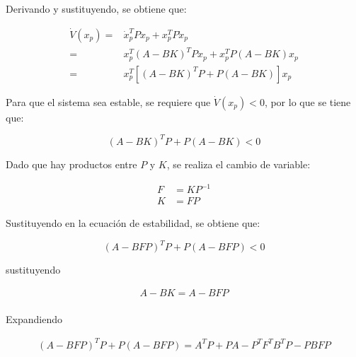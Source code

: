 \begin{enumerate}
\begin{itemize}
        Derivando y sustituyendo, se obtiene que:

        \begin{equation*}
            \begin{aligned}
                \dot{V}(x_p)=&\dot{x}_p^TPx_p+x_p^TP\dot{x}_p\\
                =&x_p^T(A-BK)^TPx_p+x_p^TP(A-BK)x_p\\
                =&x_p^T[(A-BK)^TP+P(A-BK)]x_p
            \end{aligned}
        \end{equation*}

        Para que el sistema sea estable, se requiere que \(\dot{V}(x_p)<0\), por lo que se tiene que:

        \begin{equation*}
            (A-BK)^TP+P(A-BK)<0
        \end{equation*}

        Dado que hay productos entre \(P\) y \(K\), se realiza el cambio de variable:

        \begin{equation*}
            \begin{aligned}
                F&=KP^{-1}\\
                K&=FP
            \end{aligned}
        \end{equation*}

        Sustituyendo en la ecuación de estabilidad, se obtiene que:

        \begin{equation*}
            (A-BFP)^TP+P(A-BFP)<0
        \end{equation*}   

        sustituyendo

        \begin{equation*}
            \begin{aligned}
                A-BK=A-BFP\\
            \end{aligned}
        \end{equation*}

        Expandiendo

        \begin{equation*}
            \begin{aligned}
                (A-BFP)^TP+P(A-BFP)=A^TP+PA-P^TF^TB^TP-PBFP\\
            \end{aligned}
        \end{equation*}


\end{itemize}
\end{enumerate}
